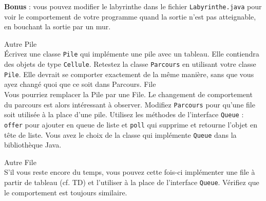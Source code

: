 \documentclass[iutinfo,a4paper,nocorrections,10pt]{ustl-tdtp}
\begin{document}
\textbf{Bonus} : vous pouvez modifier le labyrinthe dans le fichier \texttt{Labyrinthe.java} pour voir le comportement de votre programme quand la sortie n'est pas atteignable, en bouchant la sortie par un mur.

\question Autre Pile \\
Écrivez une classe \texttt{Pile} qui implémente une pile avec un tableau. Elle contiendra des objets de type \texttt{Cellule}. Retestez la classe \texttt{Parcours} en utilisant votre classe \texttt{Pile}.
Elle devrait se comporter exactement de la même manière, sans que vous ayez changé quoi que ce soit dans Parcours.
\question File \\
Vous pourriez remplacer la Pile par une File. Le changement de comportement du parcours
est alors intéressant à observer. Modifiez \texttt{Parcours} pour
qu'une file soit utilisée à la place d'une pile. Utilisez les méthodes
de l'interface \texttt{Queue} : \texttt{offer} pour ajouter en queue de liste et \texttt{poll} qui supprime et retourne l'objet en tête de liste. Vous avez le choix de la classe qui implémente \texttt{Queue} dans la bibliothèque Java.


\question Autre File \\
S'il vous reste encore du temps, vous pouvez cette fois-ci implémenter une file à partir de tableau (cf. TD) et l'utiliser à la place de l'interface \texttt{Queue}. Vérifiez que le comportement est toujours similaire. 

%
\end{document}
